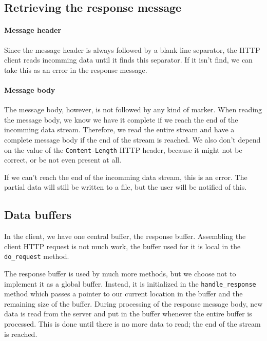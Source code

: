 \documentclass[11pt]{article}
\begin{document}
\subsection{Retrieving the response message}

\paragraph{Message header}

Since the message header is always followed by a blank line separator, the
HTTP client reads incomming data until it finds this separator. If it isn't
find, we can take this as an error in the response message.

\paragraph{Message body}

The message body, however, is not followed by any kind of marker. When reading
the message body, we know we have it complete if we reach the end of the
incomming data stream. Therefore, we read the entire stream and have a
complete message body if the end of the stream is reached. We also don't
depend on the value of the \lstinline|Content-Length| HTTP header, because it
might not be correct, or be not even present at all.

If we can't reach the end of the incomming data stream, this is an error. The
partial data will still be written to a file, but the user will be notified of
this.


\subsection{Data buffers}\label{sec:clientbuffers}

In the client, we have one central buffer, the response buffer. Assembling the
client HTTP request is not much work, the buffer used for it is local in the
\lstinline|do_request| method.

The response buffer is used by much more methods, but we choose not to
implement it as a global buffer. Instead, it is initialized in the
\lstinline|handle_response| method which passes a pointer to our current
location in the buffer and the remaining size of the buffer. During processing
of the response message body, new data is read from the server and put in the
buffer whenever the entire buffer is processed. This is done until there is no
more data to read; the end of the stream is reached.
\end{document}
